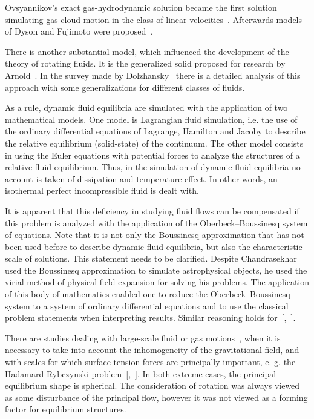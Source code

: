 Ovsyannikov’s exact gas-hydrodynamic solution became the first solution    si\-mulating gas cloud motion in the class of linear velocities~\cite{ulg:bib:Borisov}. Afterwards models of Dyson and Fujimoto were proposed~\cite{ulg:bib:Borisov}.



There is another substantial model, which influenced the development of the theory of rotating fluids. It is the generalized solid proposed for research by Arnold~\cite{ulg:bib:Arnold}. In the survey made by Dolzhansky~\cite{ulg:bib:Dolzhansky} there is a detailed analysis of this approach with some generalizations for different classes of fluids.



As a rule, dynamic fluid equilibria are simulated with the application of two mathematical models. One model is Lagrangian fluid simulation, i.e. the use of the ordinary differential equations of Lagrange, Hamilton and Jacoby to describe the relative equilibrium (solid-state) of the continuum. The other model consists in using the Euler equations with potential forces to analyze the structures of a relative fluid equilibrium. Thus, in the simulation of dynamic fluid equilibria no account is taken of dissipation and temperature effect. In other words, an isothermal perfect incompressible fluid is dealt with. 

	

It is apparent that this deficiency in studying fluid flows can be compensated if this problem is analyzed with the application of the Oberbeck--Boussinesq system of equations. Note that it is not only the Boussinesq approximation that has not been used before to describe dynamic fluid equilibria, but also the characteristic scale of solutions. This statement needs to be clarified. Despite Chandrasekhar~\cite{ulg:bib:Chandrasekhar} used the Boussinesq approximation to simulate astrophysical objects, he used the virial method of physical field expansion for solving his problems. The application of this body of mathematics enabled one to reduce the Oberbeck--Boussinesq system to a system of ordinary differential equations and to use the classical problem statements when interpreting results. Similar reasoning holds for~[,~].

	

There are studies dealing with large-scale fluid or gas motions~\cite{ulg:bib:Chandrasekhar}, when it is necessary to take into account the inhomogeneity of the gravitational field, and with scales for which surface tension forces are principally important, e. g. the Hadamard-Rybczynski problem~[,~]. In both extreme cases, the principal equilibrium shape is spherical. The consideration of rotation was always viewed as some disturbance of the principal flow, however it was not viewed as a forming factor for equilibrium structures.



